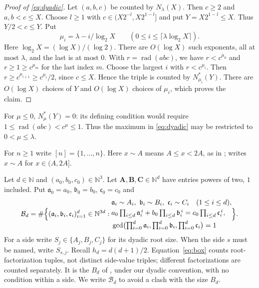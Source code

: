 \documentclass{amsart}
\theoremstyle{definition}
\theoremstyle{plain}
\numberwithin{equation}{section}
\numberwithin{table}{section}
\newcommand{\rad}{\operatorname{rad}}
\newcommand{\N}{\mathbb{N}}
\begin{document}
\begin{proof}[Proof of \eqref{eq:dyadic}]
Let $(a,b,c)$ be counted by $N_\lambda(X)$. Then $c\ge2$ and $a,b<c\le X$.
Choose $l\ge1$ with $c\in(X2^{-l},X2^{1-l}]$ and put
$Y=X2^{1-l}\le X$. Thus $Y/2<c\le Y$. Put
\[
\mu_i=\lambda-i/\log_2X\qquad
 (0\le i\le\lceil\lambda\log_2X\rceil).
\]
Here $\log_2X=(\log X)/(\log2)$.
There are $O(\log X)$ such exponents, all at most $\lambda$, and the last is
at most $0$. With $r=\rad(abc)$, we have
$r<c^{\mu_0}$ and $r\ge1\ge c^{\mu_m}$ for the last index $m$.
Choose the largest $i$ with $r<c^{\mu_i}$. Then
$r\ge c^{\mu_{i+1}}\ge c^{\mu_i}/2$, since $c\le X$.
Hence the triple is counted by $N^*_{\mu_i}(Y)$. There are $O(\log X)$ choices
of $Y$ and $O(\log X)$ choices of $\mu_i$, which proves the claim.
\end{proof}

For $\mu\le0$, $N^*_{\mu}(Y)=0$: its defining condition would require
$1\le\rad(abc)<c^\mu\le1$. Thus the maximum in \eqref{eq:dyadic} may be
restricted to $0<\mu\le\lambda$.

For $n\ge1$ write $[n]=\{1,\ldots,n\}$. Here $x\sim A$ means $A\le x<2A$, as
in \cite{Be}; \cite{BBLT} writes $x\sim A$ for $x\in(A,2A]$.

Let $d\in\N$ and $(a_0,b_0,c_0)\in\N^3$. Let $\mathbf A,\mathbf B,\mathbf C\in\N^d$
have entries powers of two, $1$ included. Put $\mathfrak a_0=a_0$,
$\mathfrak b_0=b_0$, $\mathfrak c_0=c_0$ and
\begin{equation}\label{eq:box}
 \mathcal B_d=\#\Bigl\{(\mathfrak a_i,\mathfrak b_i,\mathfrak c_i)_{i=1}^d\in\N^{3d}:
 \begin{aligned}
  &\mathfrak a_i\sim A_i,\ \mathfrak b_i\sim B_i,\ \mathfrak c_i\sim C_i\quad(1\le i\le d),\\
  &a_0\textstyle\prod_{i\le d}\mathfrak a_i^{\,i}+b_0\prod_{i\le d}\mathfrak b_i^{\,i}
    =c_0\prod_{i\le d}\mathfrak c_i^{\,i},\\
  &\gcd\bigl(\textstyle\prod_{i=0}^{d}\mathfrak a_i,
    \prod_{i=0}^{d}\mathfrak b_i,\prod_{i=0}^{d}\mathfrak c_i\bigr)=1
 \end{aligned}\Bigr\}.
\end{equation}
For a side write $S_j\in\{A_j,B_j,C_j\}$ for its dyadic root size. When the
side $s$ must be named, write $S_{s,j}$. Recall $h_d=d(d+1)/2$.
Equation~\eqref{eq:box} counts root-factorization tuples, not distinct
side-value triples; different factorizations are counted separately. It is
the $B_d$ of \cite{BBLT}, under our dyadic convention, with no condition within
a side. We write $\mathcal B_d$ to avoid a clash with the size $B_d$.
\end{document}
